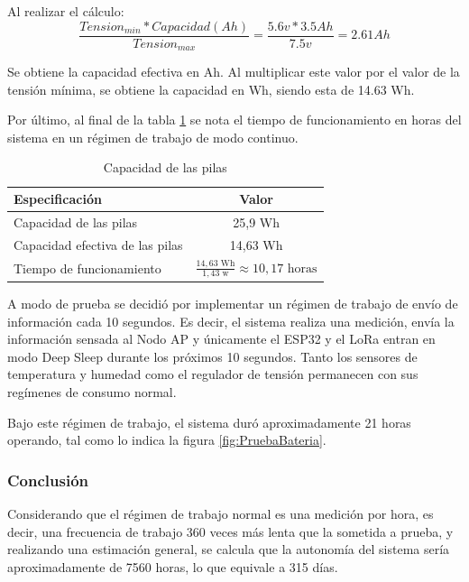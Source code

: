 Al realizar el cálculo:
\begin{equation}
   \frac{Tension_{min} * Capacidad (Ah)}{Tension_{max}} = \frac{5.6v * 3.5Ah}{7.5v} = 2.61 Ah
\label{eq:capacidadEfectiva}
\end{equation}

Se obtiene la capacidad efectiva en Ah. Al multiplicar este valor por el valor de la tensión mínima, se obtiene la capacidad en Wh, siendo esta de 14.63 Wh.

Por último, al final de la tabla \ref{tab:capacidadPilas} se nota el tiempo de funcionamiento en horas del sistema en un régimen de trabajo de modo continuo.

\begin{table}[H]
    \centering
    \begin{tabular}{@{}lc@{}}
        \toprule
        \textbf{Especificación}       & \textbf{Valor}          \\ \midrule
        Capacidad de las pilas     & 25,9 Wh       \\ 
        Capacidad efectiva de las pilas      & 14,63 Wh      \\ 
        Tiempo de funcionamiento & $\frac{14,63 \text{ Wh}}{1,43 \text{ w}} \approx 10,17 \text{ horas}$ \\ \bottomrule
    \end{tabular}
    \caption{Capacidad de las pilas}
    \label{tab:capacidadPilas}
\end{table}

A modo de prueba se decidió por implementar un régimen de trabajo de envío de información cada 10 segundos. Es decir, el sistema realiza una medición, envía la información sensada al Nodo AP y únicamente el ESP32 y el LoRa entran en modo Deep Sleep durante los próximos 10 segundos. Tanto los sensores de temperatura y humedad como el regulador de tensión permanecen con sus regímenes de consumo normal.

Bajo este régimen de trabajo, el sistema duró aproximadamente 21 horas operando, tal como lo indica la figura \ref{fig:PruebaBateria}.

\subsubsection{Conclusión}
Considerando que el régimen de trabajo normal es una medición por hora, es decir, una frecuencia de trabajo 360 veces más lenta que la sometida a prueba, y realizando una estimación general, se calcula que la autonomía del sistema sería aproximadamente de 7560 horas, lo que equivale a 315 días.

